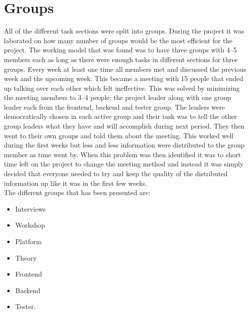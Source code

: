 \section{Groups} 
All of the different task sections were split into groups. During the project it was laborated on how many number of groups would be the most efficient for the project. The working model that was found was to have three groups with 4--5 members each as long as there were enough tasks in different sections for three groups. Every week at least one time all members met and discussed the previous week and the upcoming week. This became a meeting with 15 people that ended up talking over each other which felt ineffective. This was solved by minimizing the meeting members to 3--4 people: the project leader along with one group leader each from the frontend, backend and tester group. The leaders were democratically chosen in each active group and their task was to tell the other group leaders what they have and will accomplish during next period. They then went to their own groups and told them about the meeting. This worked well during the first weeks but less and less information were distributed to the group member as time went by. When this problem was then identified it was to short time left on the project to change the meeting method and instead it was simply decided that everyone needed to try and keep the quality of the distributed information up like it was in the first few weeks. \\
The different groups that has been presented are:\\
 \begin{itemize}
 \item Interviews
 \item Workshop
 \item Platform
 \item Theory
 \item Frontend
 \item Backend
 \item Tester.
 \end{itemize}


